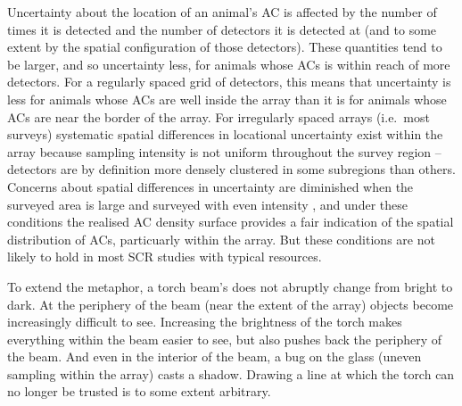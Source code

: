 \documentclass[useAMS,usenatbib,referee]{biom}
\begin{document}
Uncertainty about the location of an animal's AC is affected by the number of times it is detected and the number of detectors it is detected at (and to some extent by the spatial configuration of those detectors). These quantities tend to be larger, and so uncertainty less, for animals whose ACs is within reach of more detectors. For a regularly spaced grid of detectors, this means that uncertainty is less for animals whose ACs are well inside the array than it is for animals whose ACs are near the border of the array. For irregularly spaced arrays (i.e.\ most surveys) systematic spatial differences in locational uncertainty exist within the array because sampling intensity is not uniform throughout the survey region -- detectors are by definition more densely clustered in some subregions than others. Concerns about spatial differences in uncertainty are diminished when the surveyed area is large and surveyed with even intensity \citep[e.g.][]{Bischof2020}, and under these conditions the realised AC density surface provides a fair indication of the spatial distribution of ACs, particuarly within the array. But these conditions are not likely to hold in most SCR studies with typical resources.

To extend the metaphor, a torch beam's does not abruptly change from bright to dark. At the periphery of the beam (near the extent of the array) objects become increasingly difficult to see. Increasing the brightness of the torch makes everything within the beam easier to see, but also pushes back the periphery of the beam. And even in the interior of the beam, a bug on the glass (uneven sampling within the array) casts a shadow. Drawing a line at which the torch can no longer be trusted is to some extent arbitrary. 



\end{document}
